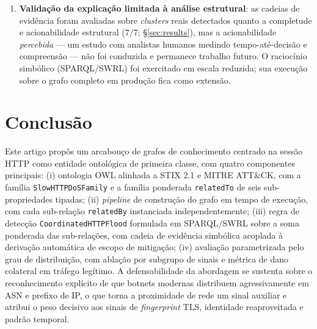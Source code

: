 \documentclass[preprint,12pt]{elsarticle}
\begin{document}
\begin{enumerate}
    \item \textbf{Validação da explicação limitada à análise estrutural}: as cadeias de evidência foram avaliadas sobre \emph{clusters} reais detectados quanto a completude e acionabilidade estrutural ($7/7$; §\ref{sec:results}), mas a acionabilidade \emph{percebida} --- um estudo com analistas humanos medindo tempo-até-decisão e compreensão --- não foi conduzida e permanece trabalho futuro. O raciocínio simbólico (SPARQL/SWRL) foi exercitado em escala reduzida; sua execução sobre o grafo completo em produção fica como extensão.
\end{enumerate}


\section{Conclusão}
\label{sec:conclusion}

Este artigo propôs um arcabouço de grafos de conhecimento centrado na sessão HTTP como entidade ontológica de primeira classe, com quatro componentes principais: (i) ontologia OWL alinhada a STIX 2.1 e MITRE ATT\&CK, com a família \texttt{SlowHTTPDoSFamily} e a família ponderada \texttt{relatedTo} de seis sub-propriedades tipadas; (ii) \emph{pipeline} de construção do grafo em tempo de execução, com cada sub-relação \texttt{relatedBy} instanciada independentemente; (iii) regra de detecção \texttt{CoordinatedHTTPFlood} formulada em SPARQL/SWRL sobre a soma ponderada das sub-relações, com cadeia de evidência simbólica acoplada à derivação automática de escopo de mitigação; (iv) avaliação parametrizada pelo grau de distribuição, com ablação por subgrupo de sinais e métrica de dano colateral em tráfego legítimo. A defensabilidade da abordagem se sustenta sobre o reconhecimento explícito de que botnets modernas distribuem agressivamente em ASN e prefixo de IP, o que torna a proximidade de rede um sinal auxiliar e atribui o peso decisivo aos sinais de \emph{fingerprint} TLS, identidade reaproveitada e padrão temporal.
\end{document}
